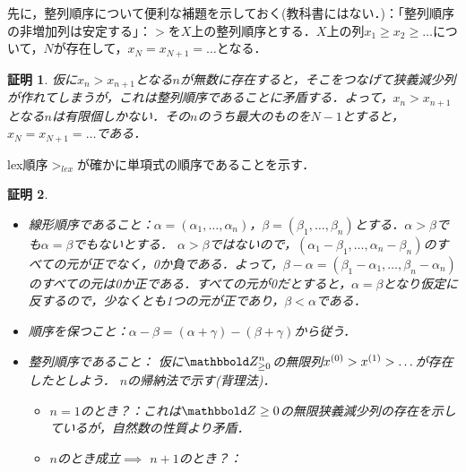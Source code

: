 \documentclass[9pt]{ltjsarticle}
\theoremstyle{break}
\theoremstyle{break}
\theoremstyle{break}
\theoremstyle{break}
\theoremstyle{break}
\theoremstyle{break}
\theoremstyle{break}
\theoremstyle{break}
\theoremstyle{break}
\theoremstyle{break}
\theoremstyle{break}
\theoremstyle{break}
\theoremstyle{break}
\theoremstyle{break}
\theoremstyle{break}
\theoremstyle{nonumberbreak}
\newtheorem{myproof}{証明}
\theoremstyle{nonumberbreak}
\begin{document}
先に，整列順序について便利な補題を示しておく(教科書にはない．)：「整列順序の非増加列は安定する」：$>$を$X$上の整列順序とする．$X$上の列$x_1\ge x_2 \ge \dots$について，$N$が存在して，$x_N = x_{N+1} = \dots$となる．
\begin{myproof}
 仮に$x_n > x_{n+1}$となる$n$が無数に存在すると，そこをつなげて狭義減少列が作れてしまうが，これは整列順序であることに矛盾する．よって，$x_n > x_{n+1}$となる$n$は有限個しかない．その$n$のうち最大のものを$N-1$とすると，$x_N = x_{N+1} = \dots$である．
\end{myproof}

lex順序$>_{lex}$が確かに単項式の順序であることを示す．
\begin{myproof}
 \begin{itemize}
  \item 線形順序であること：$\alpha = (\alpha_1,\dots,\alpha_n)$，$\beta = (\beta_1,\dots,\beta_n)$とする．$\alpha > \beta$でも$\alpha = \beta$でもないとする．
$\alpha > \beta$ではないので，$(\alpha_1-\beta_1,\dots,\alpha_n-\beta_n)$のすべての元が正でなく，0か負である．よって，$\beta-\alpha = (\beta_1-\alpha_1,\dots,\beta_n-\alpha_n)$のすべての元は0か正である．すべての元が0だとすると，$\alpha = \beta$となり仮定に反するので，少なくとも1つの元が正であり，$\beta < \alpha$である．
  \item 順序を保つこと：$\alpha-\beta = (\alpha+\gamma)-(\beta+\gamma)$から従う．
  \item 整列順序であること：
仮に$\Zge^n$の無限列$x^{(0)}>x^{(1)}>\dots$が存在したとしよう．
$n$の帰納法で示す(背理法)．
\begin{itemize}
 \item $n=1$のとき？：これは$\Z\ge 0$の無限狭義減少列の存在を示しているが，自然数の性質より矛盾．
 \item $n$のとき成立$\implies$ $n+1$のとき？：

\end{itemize}
\end{itemize}
\end{myproof}
\end{document}
